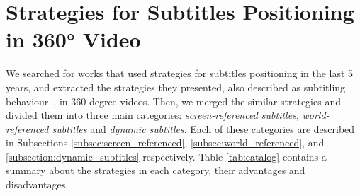 \section{Strategies for Subtitles Positioning in 360° Video}
\label{sec:subtitles}
We searched for works that used strategies for subtitles positioning in the last 5 years, and extracted the strategies they presented, also described as subtitling behaviour~\cite{brown_subtitles_2017}, in 360-degree videos. Then, we merged the similar strategies and divided them into three main categories: \emph{screen-referenced subtitles}, \emph{world-referenced subtitles} and \emph{dynamic subtitles}. Each of these categories are described in Subsections \ref{subsec:screen_referenced}, \ref{subsec:world_referenced}, and \ref{subsection:dynamic_subtitles} respectively. Table \ref{tab:catalog} contains a summary about the strategies in each category, their advantages and disadvantages.

